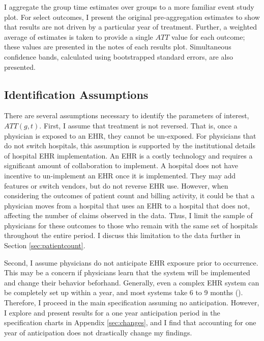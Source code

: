\documentclass[12pt]{article}
\begin{document}
I aggregate the group time estimates over groups to a more familiar event study plot. For select outcomes, I present the original pre-aggregation estimates to show that results are not driven by a particular year of treatment.  Further, a weighted average of estimates is taken to provide a single $ATT$ value for each outcome; these values are presented in the notes of each results plot. Simultaneous confidence bands, calculated using bootstrapped standard errors, are also presented. 

\subsection{Identification Assumptions}

There are several assumptions necessary to identify the parameters of interest, $ATT(g,t)$. First, I assume that treatment is not reversed. That is, once a physician is exposed to an EHR, they cannot be un-exposed. For physicians that do not switch hospitals, this assumption is supported by the institutional details of hospital EHR implementation. An EHR is a costly technology and requires a significant amount of collaboration to implement. A hospital does not have incentive to un-implement an EHR once it is implemented. They may add features or switch vendors, but do not reverse EHR use. However, when considering the outcomes of patient count and billing activity, it could be that a physician moves from a hospital that uses an EHR to a hospital that does not, affecting the number of claims observed in the data. Thus, I limit the sample of physicians for these outcomes to those who remain with the same set of hospitals throughout the entire period. I discuss this limitation to the data further in Section \ref{sec:patientcount}.

Second, I assume physicians do not anticipate EHR exposure prior to occurrence. This may be a concern if physicians learn that the system will be implemented and change their behavior beforhand. Generally, even a complex EHR system can be completely set up within a year, and most systems take 6 to 9 months (\cite{uzialko_2021}). Therefore, I proceed in the main specification assuming no anticipation. However, I explore and present results for a one year anticipation period in the specification charts in Appendix \ref{sec:changes}, and I find that accounting for one year of anticipation does not drastically change my findings.  
\end{document}
